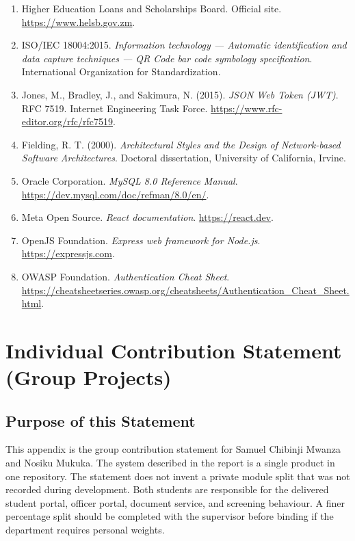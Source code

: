 \documentclass[12pt,a4paper]{report}
\begin{document}
\begin{enumerate}
    \item Higher Education Loans and Scholarships Board. Official site. \url{https://www.helsb.gov.zm}.
    \item ISO/IEC 18004:2015. \textit{Information technology --- Automatic identification and data capture techniques --- QR Code bar code symbology specification}. International Organization for Standardization.
    \item Jones, M., Bradley, J., and Sakimura, N. (2015). \textit{JSON Web Token (JWT)}. RFC 7519. Internet Engineering Task Force. \url{https://www.rfc-editor.org/rfc/rfc7519}.
    \item Fielding, R. T. (2000). \textit{Architectural Styles and the Design of Network-based Software Architectures}. Doctoral dissertation, University of California, Irvine.
    \item Oracle Corporation. \textit{MySQL 8.0 Reference Manual}. \url{https://dev.mysql.com/doc/refman/8.0/en/}.
    \item Meta Open Source. \textit{React documentation}. \url{https://react.dev}.
    \item OpenJS Foundation. \textit{Express web framework for Node.js}. \url{https://expressjs.com}.
    \item OWASP Foundation. \textit{Authentication Cheat Sheet}. \url{https://cheatsheetseries.owasp.org/cheatsheets/Authentication_Cheat_Sheet.html}.
\end{enumerate}

\appendix

\chapter{Individual Contribution Statement (Group Projects)}

\section*{Purpose of this Statement}
This appendix is the group contribution statement for Samuel Chibinji Mwanza and Nosiku Mukuka. The system described in the report is a single product in one repository. The statement does not invent a private module split that was not recorded during development. Both students are responsible for the delivered student portal, officer portal, document service, and screening behaviour. A finer percentage split should be completed with the supervisor before binding if the department requires personal weights.
\end{document}
